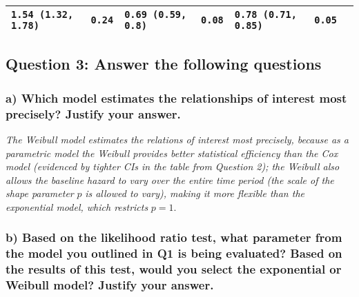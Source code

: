 \documentclass[]{article}
\begin{document}
\begin{longtable}[]{@{}lllllll@{}}
\begin{minipage}[t]{0.19\columnwidth}
\tt{1.54} (\tt{1.32}, \tt{1.78})\strut
\end{minipage} & \begin{minipage}[t]{0.05\columnwidth}\raggedright\strut
\tt{0.24}\strut
\end{minipage} & \begin{minipage}[t]{0.19\columnwidth}\raggedright\strut
\tt{0.69} (\tt{0.59}, \tt{0.8})\strut
\end{minipage} & \begin{minipage}[t]{0.05\columnwidth}\raggedright\strut
\tt{0.08}\strut
\end{minipage} & \begin{minipage}[t]{0.19\columnwidth}\raggedright\strut
\tt{0.78} (\tt{0.71}, \tt{0.85})\strut
\end{minipage} & \begin{minipage}[t]{0.05\columnwidth}\raggedright\strut
\tt{0.05}\strut
\end{minipage}\tabularnewline
\bottomrule
\end{longtable}

\vspace{12pt}

\subsection{Question 3: Answer the following
questions}\label{question-3-answer-the-following-questions}

\subsubsection{a) Which model estimates the relationships of interest
most precisely? Justify your
answer.}\label{a-which-model-estimates-the-relationships-of-interest-most-precisely-justify-your-answer.}

\emph{The Weibull model estimates the relations of interest most
precisely, because as a parametric model the Weibull provides better
statistical efficiency than the Cox model (evidenced by tighter CIs in
the table from Question 2); the Weibull also allows the baseline hazard
to vary over the entire time period (the scale of the shape parameter}
\(p\) \emph{is allowed to vary), making it more flexible than the
exponential model, which restricts} \(p = 1\).

\vspace{2pt}

\subsubsection{b) Based on the likelihood ratio test, what parameter
from the model you outlined in Q1 is being evaluated? Based on the
results of this test, would you select the exponential or Weibull model?
Justify your
answer.}\label{b-based-on-the-likelihood-ratio-test-what-parameter-from-the-model-you-outlined-in-q1-is-being-evaluated-based-on-the-results-of-this-test-would-you-select-the-exponential-or-weibull-model-justify-your-answer.}
\end{document}
